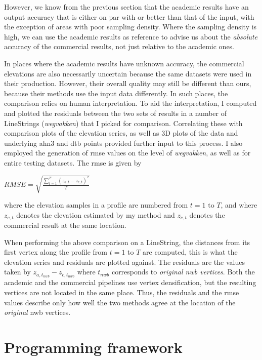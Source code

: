 However, we know from the previous section that the academic results have an output accuracy that is either on par with or better than that of the input, with the exception of areas with poor sampling density. Where the sampling density is high, we can use the academic results as reference to advise us about the \textit{absolute} accuracy of the commercial results, not just relative to the academic ones.

In places where the academic results have unknown accuracy, the commercial elevations are also necessarily uncertain because the same datasets were used in their production. However, their overall quality may still be different than ours, because their methods use the input data differently. In such places, the comparison relies on human interpretation. To aid the interpretation, I computed and plotted the residuals between the two sets of results in a number of LineStrings (\textit{wegvakken}) that I picked for comparison. Correlating these with comparison plots of the elevation series, as well as 3D plots of the data and underlying \ac{ahn3} and \ac{dtb} points provided further input to this process. I also employed the generation of \ac{rmse} values on the level of \textit{wegvakken}, as well as for entire testing datasets. The \ac{rmse} is given by

$RMSE = \sqrt{\frac{\sum_{t=1}^{T}\left(z_{a,t} - z_{c,t}\right)^2}{T}}$

where the elevation samples in a profile are numbered from $t=1$ to $T$, and where $z_{c,t}$ denotes the elevation estimated by my method and $z_{c,t}$ denotes the commercial result at the same location.

When performing the above comparison on a LineString, the distances from its first vertex along the profile from $t=1$ to $T$ are computed, this is what the elevation series and residuals are plotted against. The residuals are the values taken by $z_{a,t_{nwb}} - z_{c,t_{nwb}}$ where $t_{nwb}$ corresponds to \textit{original \ac{nwb} vertices}. Both the academic and the commercial pipelines use vertex densification, but the resulting vertices are not located in the same place. Thus, the residuals and the \ac{rmse} values describe only how well the two methods agree at the location of the \textit{original} \ac{nwb} vertices.

\section{Programming framework}
\label{sec:programming}

